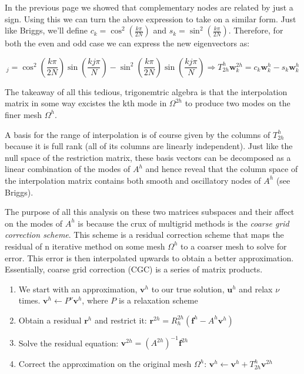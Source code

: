 \documentclass[pdftex,12pt,a4paper]{article}
\begin{document}
In the previous page we showed that complementary nodes are related by just a sign.  Using this we can turn the above expression to take on a similar form. Just like Briggs, we'll define $c_k = \cos^2 \left( \frac{k \pi}{2N} \right)$ and $s_k = \sin^2 \left( \frac{k \pi}{2N} \right)$.  Therefore, for both the even and odd case we can express the new eigenvectors as:  

\begin{equation}
[T_{2h}^h \mathbf{w}_k^{2h}]_j =  \cos^2 \left( \frac{k \pi}{2N} \right) \sin\left( \frac{ k j \pi }{N} \right) - \sin^2 \left( \frac{k \pi}{2N} \right) \sin\left( \frac{ k j \pi }{N} \right) 
\Rightarrow 
 T_{2h}^h \mathbf{w}_k^{2h} = c_k \mathbf{w}_k^h - s_k \mathbf{w}_k^h
\end{equation}

The takeaway of all this tedious, trigonemtric algebra is that the interpolation matrix in some way excistes the kth mode in $\Omega^{2h}$ to produce two modes on the finer mesh $\Omega^h$.  

A basis for the range of interpolation is of course given by the columns of $T_{2h}^h$ because it is full rank (all of its columns are linearly independent).  Just like the null space of the restriction matrix, these basis vectors can be decomposed as a linear combination of the modes of $A^h$ and hence reveal that the column space of the interpolation matrix contains both smooth and oscillatory nodes of $A^h$ (see Briggs).  

The purpose of all this analysis on these two matrices subspaces and their affect on the modes of $A^h$ is because the crux of multigrid methods is the \textit{coarse grid correction scheme}.  This scheme is a residual correction scheme that maps the residual of n iterative method on some mesh $\Omega^h$ to a coarser mesh to solve for error.  This error is then interpolated upwards to obtain a better approximation.  Essentially, coarse grid correction (CGC) is a series of matrix products.  
\begin{enumerate}
\item We start with an approximation, $\mathbf{v}^h$ to our true solution, $\mathbf{u}^h$ and relax $\nu$ times. $\mathbf{v}^h \leftarrow P^{ \nu} \mathbf{v}^h $, where $P$ is a relaxation scheme

\item Obtain a residual $\mathbf{r}^h$ and restrict it: $ \mathbf{r}^{2h}  = R_h^{2h} ( \mathbf{f}^h -  A^h \mathbf{v}^h )$

\item Solve the residual equation: $\mathbf{v}^{2h} = (A^{2h})^{-1} \mathbf{f}^{2h} $

\item Correct the approximation on the original mesh $\Omega^h$: $\mathbf{v}^h \leftarrow \mathbf{v}^h + T_{2h}^h \mathbf{v}^{2h} $
\end{enumerate}
\end{document}
